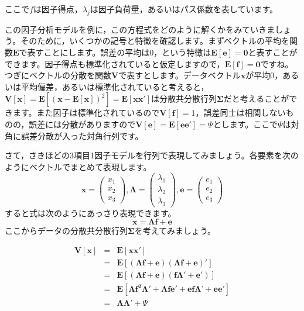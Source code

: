 \documentclass{ltjsbook}
\begin{document}
ここで$f$は因子得点，$\lambda_j$は因子負荷量，あるいはパス係数を表しています。

この因子分析モデルを例に，この方程式をどのように解くかをみていきましょう。そのために，いくつかの記号と特徴を確認します。まずベクトルの平均を関数$\bm{E}$で表すことにします。誤差の平均は0，という特徴は$\bm{E} \left[ \bm{e} \right] = \bm{0}$と表すことができます。因子得点も標準化されていると仮定しますので，$\bm{E} \left[ \bm{f}\right] = \bm{0}$ですね。つぎにベクトルの分散を関数$\bm{V}$で表すとします。データベクトル$\bm{x}$が平均0，あるいは平均偏差，あるいは標準化されていると考えると，$\bm{V} \left [ \bm{x} \right] =\bm{E} \left[ ( \bm{x} - \bm{E}\left[ \bm{x} \right] )^2 \right ] = \bm{E} \left [ \bm{xx'}\right]$は分散共分散行列$\bm{\Sigma}$だと考えることができます。また因子は標準化されているので$\bm{V}\left [ \bm{f} \right ] = 1$，誤差同士は相関しないものの，誤差には分散がありますので$\bm{V}\left[ \bm{e} \right]=\bm{E} \left[ \bm{ee'}\right] = \Psi$とします。ここで$\Psi$は対角に誤差分散が入った対角行列です。

さて，さきほどの3項目1因子モデルを行列で表現してみましょう。各要素を次のようにベクトルでまとめて表現します。
\[ \bm{x} = \begin{pmatrix} x_1\\x_2\\x_3 \end{pmatrix}, \bm{\Lambda} = \begin{pmatrix} \lambda_1\\ \lambda_2 \\ \lambda_3 \end{pmatrix}, \bm{e} = \begin{pmatrix} e_1 \\ e_2 \\ e_3 \end{pmatrix} \]
すると式は次のようにあっさり表現できます。
\[ \bm{x} = \bm{\Lambda} \bm{f} + \bm{e} \]
ここからデータの分散共分散行列$\bm{\Sigma}$を考えてみましょう。

\begin{eqnarray*}
    \bm{V}\left[ \bm{x} \right] &=& \bm{E}\left[ \bm{xx'}\right]\\
    &=& \bm{E}\left[ (\bm{\Lambda f}+\bm{e}) (\bm{\Lambda f}+\bm{e})' \right] \\
    &=& \bm{E}\left[ (\bm{\Lambda f}+\bm{e}) (\bm{f \Lambda' }+\bm{e'}) \right] \\
    &=& \bm{E}\left[ \bm{ \Lambda f^2 \Lambda' + \Lambda f e'  + ef\Lambda’ + ee' } \right] \\
    &=& \bm{\Lambda \Lambda'} + \Psi \\
\end{eqnarray*}
\end{document}
